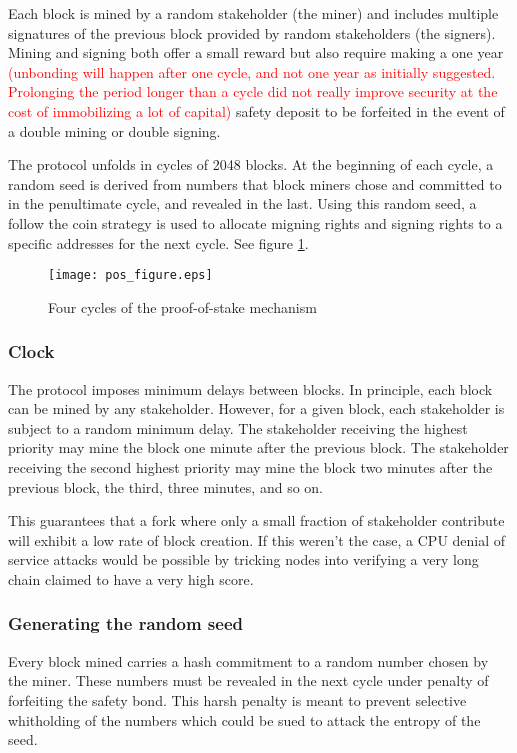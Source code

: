 \documentclass[letterpaper]{article}
\newcommand\change[1]{\textcolor{red}{#1}}
\begin{document}
Each block is mined by a random stakeholder (the miner) and includes
multiple signatures of the previous block provided by random 
stakeholders (the signers). Mining and signing both offer a small reward but
also require making a one year \change{(unbonding will happen after one cycle, and not one year as initially suggested. Prolonging the period longer than a cycle did not really improve security at the cost of immobilizing a lot of capital)} safety deposit to be
forfeited in the event of a double mining or double signing.

The protocol unfolds in cycles of \num{2048} blocks. At the beginning of each
cycle, a random seed is derived from numbers that block miners chose and committed
to in the penultimate cycle, and revealed in the last. Using this random seed,
a follow the coin strategy is used to allocate migning rights and signing rights
to a specific addresses for the next cycle. See figure \ref{fig:pos_figure}.

\begin{figure}[b!]
  \centering
  \texttt{[image: pos\_figure.eps]}
  \caption{Four cycles of the proof-of-stake mechanism}
  \label{fig:pos_figure}
\end{figure}


\subsubsection{Clock}

The protocol imposes minimum delays between blocks. In principle, each block
can be mined by any stakeholder. However, for a given block, each stakeholder
is subject to a random minimum delay. The stakeholder receiving the highest
priority may mine the block one minute after the previous block. The
stakeholder receiving the second highest priority may mine the block two
minutes after the previous block, the third, three minutes, and so on.

This guarantees that a fork where only a small fraction of stakeholder
contribute will exhibit a low rate of block creation. If this weren't 
the case, a CPU denial of service attacks would be possible by
tricking nodes into verifying a very long chain claimed to have a very high
score.

\subsubsection{Generating the random seed}

Every block mined carries a hash commitment to a random number chosen by the
miner. These numbers must be revealed in the next cycle under penalty of
forfeiting the safety bond. This harsh penalty is meant to prevent selective
whitholding of the numbers which could be sued to attack the entropy of the seed. 
\end{document}
